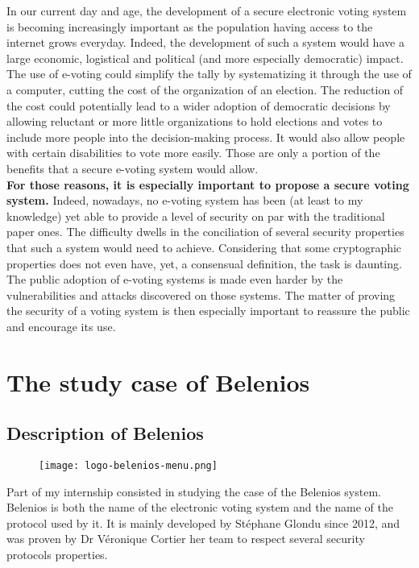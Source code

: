 \documentclass[12pt, a4paper]{report}
\begin{document}
In our current day and age, the development of a secure electronic voting system is becoming increasingly important as the population having access to the internet grows everyday. Indeed, the development of such a system would have a large economic, logistical and political (and more especially democratic) impact. The use of e-voting could simplify the tally by systematizing it through the use of a computer, cutting the cost of the organization of an election. The reduction of the cost could potentially lead to a wider adoption of democratic decisions by allowing reluctant or more little organizations to hold elections and votes to include more people into the decision-making process. It would also allow people with certain disabilities to vote more easily. Those are only a portion of the benefits that a secure e-voting system would allow.\\

\textbf{For those reasons, it is especially important to propose a secure voting system.} Indeed, nowadays, no e-voting system has been (at least to my knowledge) yet able to provide a level of security on par with the traditional paper ones. The difficulty dwells in the conciliation of several security properties that such a system would need to achieve. Considering that some cryptographic properties does not even have, yet, a consensual definition, the task is daunting.\\

The public adoption of e-voting systems is made even harder by the vulnerabilities and attacks discovered on those systems. The matter of proving the security of a voting system is then especially important to reassure the public and encourage its use.

\section{The study case of Belenios}

\subsection{Description of Belenios}

\begin{figure}[H]
\centering
\texttt{[image: logo-belenios-menu.png]}
\end{figure}

Part of my internship consisted in studying the case of the Belenios system.
Belenios is both the name of the electronic voting system and the name of the protocol used by it.
It is mainly developed by Stéphane Glondu since 2012, and was proven by Dr Véronique Cortier her team to respect several security protocols properties.\cite{BOOK:1}
\end{document}
